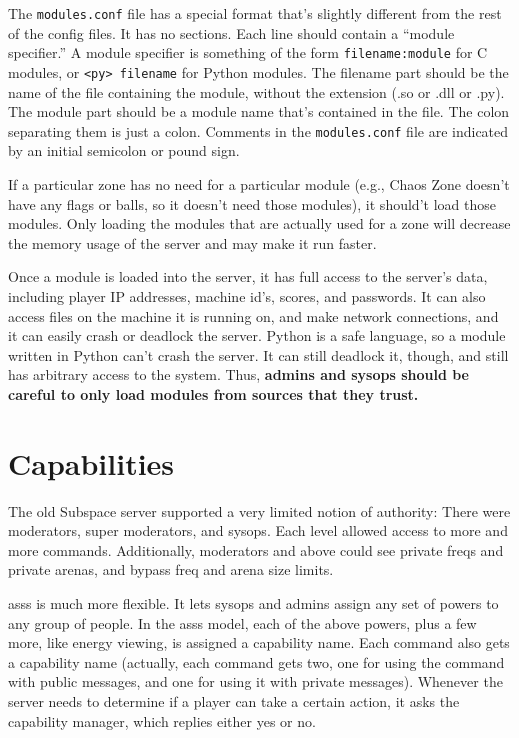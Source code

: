 \documentclass{article}
\newcommand{\asss}{asss}
\begin{document}
The \verb/modules.conf/ file has a special format that's slightly
different from the rest of the config files. It has no sections. Each
line should contain a ``module specifier.'' A module specifier is
something of the form \verb/filename:module/ for C modules, or
\verb/<py> filename/ for Python modules. The filename part should be the
name of the file containing the module, without the extension (.so or
.dll or .py). The module part should be a module name that's contained
in the file. The colon separating them is just a colon. Comments in the
\verb/modules.conf/ file are indicated by an initial semicolon or pound
sign.

If a particular zone has no need for a particular module (e.g., Chaos
Zone doesn't have any flags or balls, so it doesn't need those modules),
it should't load those modules. Only loading the modules that are
actually used for a zone will decrease the memory usage of the server
and may make it run faster.

Once a module is loaded into the server, it has full access to the
server's data, including player IP addresses, machine id's, scores, and
passwords. It can also access files on the machine it is running on, and
make network connections, and it can easily crash or deadlock the
server. Python is a safe language, so a module written in Python can't
crash the server. It can still deadlock it, though, and still has
arbitrary access to the system. Thus, \textbf{admins and sysops should
be careful to only load modules from sources that they trust.}


\section{Capabilities}

The old Subspace server supported a very limited notion of authority:
There were moderators, super moderators, and sysops. Each level allowed
access to more and more commands. Additionally, moderators and above
could see private freqs and private arenas, and bypass freq and arena
size limits.

\asss{} is much more flexible. It lets sysops and admins assign any set
of powers to any group of people. In the \asss{} model, each of the
above powers, plus a few more, like energy viewing, is assigned a
capability name. Each command also gets a capability name (actually,
each command gets two, one for using the command with public messages,
and one for using it with private messages). Whenever the server needs
to determine if a player can take a certain action, it asks the
capability manager, which replies either yes or no.
\end{document}

